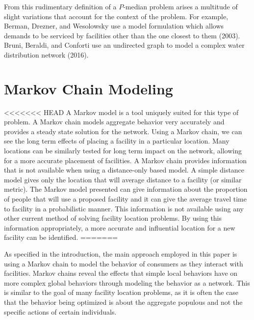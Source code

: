 \documentclass[twoside,twocolumn]{article}
\begin{document}
From this rudimentary definition of a $P$-median problem arises a multitude of slight variations that account for the context of the problem.
For example, Berman, Drezner, and Wesolowsky use a model formulation which allows demands to be serviced by facilities other than the one closest to them (2003).
Bruni, Beraldi, and Conforti use an undirected graph to model a complex water distribution network (2016).








\section{Markov Chain Modeling}
<<<<<<< HEAD
A Markov model is a tool uniquely suited for this type of problem.
A Markov chain models aggregate behavior very accurately and provides a steady state solution for the network.
Using a Markov chain, we can see the long term effects of placing a facility in a particular location.
Many locations can be similarly tested for long term impact on the network, allowing for a more accurate placement of facilities.
A Markov chain provides information that is not available when using a distance-only based model.
A simple distance model gives only the location that will average distance to a facility (or similar metric).
The Markov model presented can give information about the proportion of people that will use a proposed facility and it can give the average travel time to facility in a probabilistic manner.
This information is not available using any other current method of solving facility location problems. %
By using this information appropriately, a more accurate and influential location for a new facility can be identified.
=======

As specified in the introduction, the main approach employed in this paper is using a Markov chain to model the behavior of consumers as they interact with facilities.
Markov chains reveal the effects that simple local behaviors have on more complex global behaviors through modeling the behavior as a network.
This is similar to the goal of many facility location problems, as it is often the case that the behavior being optimized is about the aggregate populous and not the specific actions of certain individuals.
\end{document}

